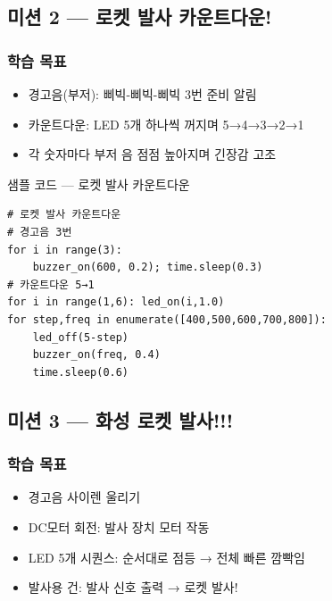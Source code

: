 \subsection{미션 2 --- 로켓 발사 카운트다운!}
\label{subsec:ch12-m2}

\begin{storybox}
\end{storybox}

\subsubsection*{학습 목표}
\begin{itemize}[leftmargin=1.4em]
  \item 경고음(부저): 삐빅-삐빅-삐빅 3번 준비 알림
  \item 카운트다운: LED 5개 하나씩 꺼지며 5→4→3→2→1
  \item 각 숫자마다 부저 음 점점 높아지며 긴장감 고조
\end{itemize}

\begin{labbox}{샘플 코드 --- 로켓 발사 카운트다운}
\begin{verbatim}
# 로켓 발사 카운트다운
# 경고음 3번
for i in range(3):
    buzzer_on(600, 0.2); time.sleep(0.3)
# 카운트다운 5→1
for i in range(1,6): led_on(i,1.0)
for step,freq in enumerate([400,500,600,700,800]):
    led_off(5-step)
    buzzer_on(freq, 0.4)
    time.sleep(0.6)
\end{verbatim}
\end{labbox}

\subsection{미션 3 --- 화성 로켓 발사!!!}
\label{subsec:ch12-m3}

\begin{storybox}
\end{storybox}

\subsubsection*{학습 목표}
\begin{itemize}[leftmargin=1.4em]
  \item 경고음 사이렌 울리기
  \item DC모터 회전: 발사 장치 모터 작동
  \item LED 5개 시퀀스: 순서대로 점등 → 전체 빠른 깜빡임
  \item 발사용 건: 발사 신호 출력 → 로켓 발사!
\end{itemize}

